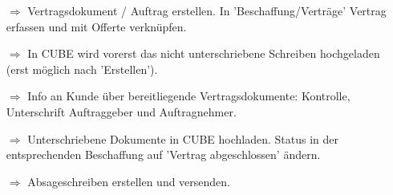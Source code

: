 \documentclass{article}
\begin{document}
\begin{multicols}{1}

\begin{tcolorbox}[colback=blue!5,colframe=blue!40!black,title=(5) Vertrag ausstellen / Abschluss der Beschaffung]
\begin{itemize}
  \item[$\Longrightarrow$] Vertragsdokument / Auftrag erstellen. In 'Beschaffung/Verträge' Vertrag erfassen und mit Offerte verknüpfen.
	\item[$\Longrightarrow$] In CUBE wird vorerst das nicht unterschriebene Schreiben hochgeladen (erst möglich nach 'Erstellen').
  \item[$\Longrightarrow$] Info an Kunde über bereitliegende Vertragsdokumente: Kontrolle, Unterschrift Auftraggeber und Auftragnehmer.
	\item[$\Longrightarrow$] Unterschriebene Dokumente in CUBE hochladen. Status in der entsprechenden Beschaffung auf 'Vertrag abgeschlossen' ändern.
	\item[$\Longrightarrow$] Absageschreiben erstellen und versenden.
\end{itemize}
\end{tcolorbox}


\end{multicols}





\end{document}
